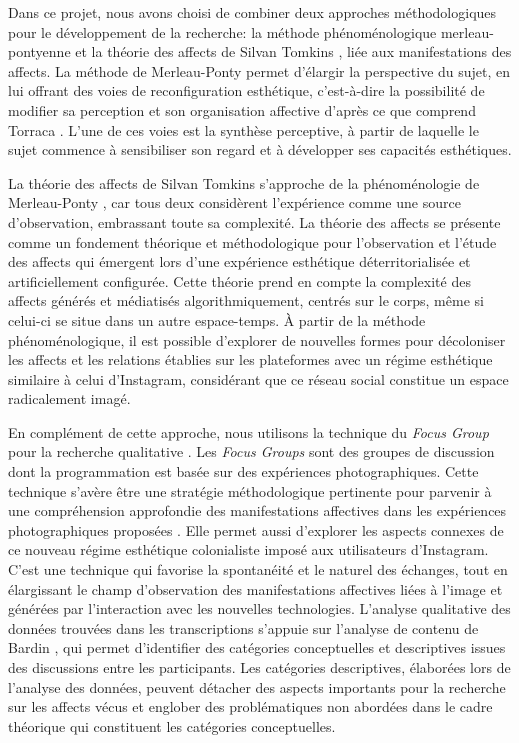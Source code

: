 \documentclass[final,fra]{anthology-ch}         %
\begin{document}
Dans ce projet, nous avons choisi de combiner deux approches méthodologiques pour le développement de la recherche: la méthode phénoménologique merleau-pontyenne \cite{merleauponty2018fenomenologia} et la théorie des affects de Silvan Tomkins \cite{tomkins1963affect,tomkins1962affect}, liée aux manifestations des affects. La méthode de Merleau-Ponty permet d'élargir la perspective du sujet, en lui offrant des voies de reconfiguration esthétique, c'est-à-dire la possibilité de modifier sa perception et son organisation affective d'après ce que comprend Torraca \cite{torraca2019espetaculo}. L'une de ces voies est la synthèse perceptive, à partir de laquelle le sujet commence à sensibiliser son regard et à développer ses capacités esthétiques.

La théorie des affects de Silvan Tomkins \cite{tomkins1963affect,tomkins1962affect} s'approche de la phénoménologie de Merleau-Ponty \cite{merleauponty2018fenomenologia}, car tous deux considèrent l'expérience comme une source d'observation, embrassant toute sa complexité. La théorie des affects se présente comme un fondement théorique et méthodologique pour l'observation et l'étude des affects qui émergent lors d'une expérience esthétique déterritorialisée et artificiellement configurée. Cette théorie prend en compte la complexité des affects générés et médiatisés algorithmiquement, centrés sur le corps, même si celui-ci se situe dans un autre espace-temps. À partir de la méthode phénoménologique, il est possible d'explorer de nouvelles formes pour décoloniser les affects et les relations établies sur les plateformes avec un régime esthétique similaire à celui d'Instagram, considérant que ce réseau social constitue un espace radicalement imagé.

En complément de cette approche, nous utilisons la technique du \emph{Focus Group} pour la recherche qualitative \cite{abreu2009grupos}. Les \textit{Focus Groups} sont des groupes de discussion dont la programmation est basée sur des expériences photographiques. Cette technique s'avère être une stratégie méthodologique pertinente pour parvenir à une compréhension approfondie des manifestations affectives dans les expériences photographiques proposées \cite{abreu2009grupos}. Elle permet aussi d'explorer les aspects connexes de ce nouveau régime esthétique colonialiste imposé aux utilisateurs d'Instagram. C'est une technique qui favorise la spontanéité et le naturel des échanges, tout en élargissant le champ d'observation des manifestations affectives liées à l'image et générées par l'interaction avec les nouvelles technologies. L'analyse qualitative des données trouvées dans les transcriptions s'appuie sur l'analyse de contenu de Bardin \cite{bardin2008analise}, qui permet d'identifier des catégories conceptuelles et descriptives issues des discussions entre les participants. Les catégories descriptives, élaborées lors de l'analyse des données, peuvent détacher des aspects importants pour la recherche sur les affects vécus et englober des problématiques non abordées dans le cadre théorique qui constituent les catégories conceptuelles.
\end{document}

